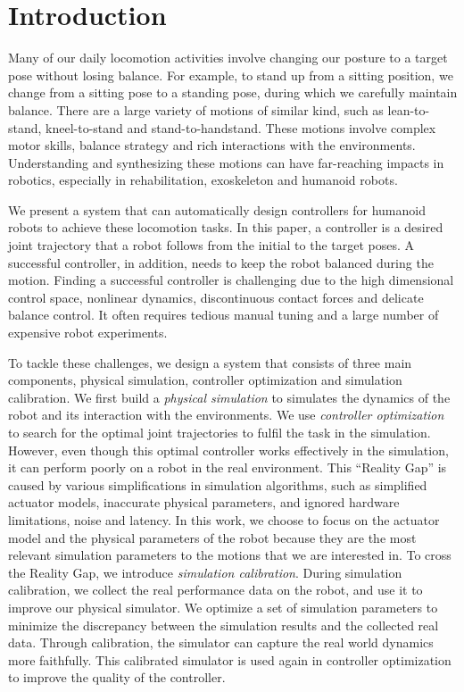 \section{Introduction}
Many of our daily locomotion activities involve changing our posture to a target pose without losing balance. For example, to stand up from a sitting position, we change from a sitting pose to a standing pose, during which we carefully maintain balance. There are a large variety of motions of similar kind, such as lean-to-stand, kneel-to-stand and stand-to-handstand. These motions involve complex motor skills, balance strategy and rich interactions with the environments. Understanding and synthesizing these motions can have far-reaching impacts in robotics, especially in rehabilitation, exoskeleton and humanoid robots.

We present a system that can automatically design controllers for humanoid robots to achieve these locomotion tasks. In this paper, a controller is a desired joint trajectory that a robot follows from the initial to the target poses. A successful controller, in addition, needs to keep the robot balanced during the motion. Finding a successful controller is challenging due to the high dimensional control space, nonlinear dynamics, discontinuous contact forces and delicate balance control. It often requires tedious manual tuning and a large number of expensive robot experiments. 

To tackle these challenges, we design a system that consists of three main components, physical simulation, controller optimization and simulation calibration. We first build a \emph{physical simulation} to simulates the dynamics of the robot and its interaction with the environments. We use \emph{controller optimization} to search for the optimal joint trajectories to fulfil the task in the simulation. However, even though this optimal controller works effectively in the simulation, it can perform poorly on a robot in the real environment. This ``Reality Gap'' \cite{Jakobi95} is caused by various simplifications in simulation algorithms, such as simplified actuator models, inaccurate physical parameters, and ignored hardware limitations, noise and latency. In this work, we choose to focus on the actuator model and the physical parameters of the robot because they are the most relevant simulation parameters to the motions that we are interested in. To cross the Reality Gap, we introduce \emph{simulation calibration}. During simulation calibration, we collect the real performance data on the robot, and use it to improve our physical simulator. We optimize a set of simulation parameters to minimize the discrepancy between the simulation results and the collected real data. Through calibration, the simulator can capture the real world dynamics more faithfully. This calibrated simulator is used again in controller optimization to improve the quality of the controller. 

